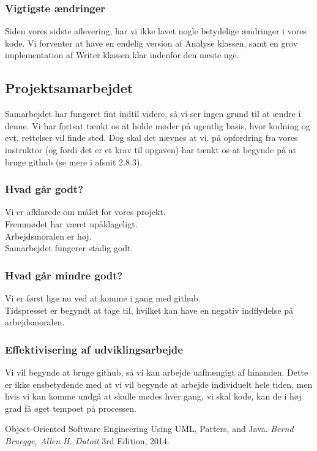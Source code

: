 \documentclass[11pt]{article}
\begin{document}
\subsubsection{Vigtigste ændringer}
Siden vores sidste aflevering, har vi ikke lavet nogle betydelige ændringer i vores kode. Vi forventer at have en endelig version af Analyse klassen, samt en grov implementation af Writer klassen klar indenfor den næste uge.
\subsection{Projektsamarbejdet}
Samarbejdet har fungeret fint indtil videre, så vi ser ingen grund til at ændre i denne.
Vi har fortsat tænkt os at holde møder på ugentlig basis, hvor kodning og evt. rettelser vil finde sted. Dog skal det nævnes at vi, på opfordring fra vores instruktor (og fordi det er et krav til opgaven) har tænkt os at begynde på at bruge github (se mere i afsnit 2.8.3).
\subsubsection{Hvad går godt?}
Vi er afklarede om målet for vores projekt.\\
Fremmødet har været upåklageligt.\\
Arbejdsmoralen er høj.\\
Samarbejdet fungerer stadig godt.
\subsubsection{Hvad går mindre godt?}
Vi er først lige nu ved at komme i gang med github.\\
Tidspresset er begyndt at tage til, hvilket kan have en negativ indflydelse på arbejdsmoralen.
\subsubsection{Effektivisering af udviklingsarbejde}
Vi vil begynde at bruge github, så vi kan arbejde uafhængigt af hinanden. Dette er ikke ensbetydende med at vi vil begynde at arbejde individuelt hele tiden, men hvis vi kan komme undgå at skulle mødes hver gang, vi skal kode, kan de i høj grad få øget tempoet på processen.
\begin{thebibliography}{9}

  Object-Oriented Software Engineering Using UML, Patters, and Java.
  \emph{Bernd Bruegge, Allen H. Dutoit}
  3rd Edition,
  2014.


\end{thebibliography}
\end{document}
